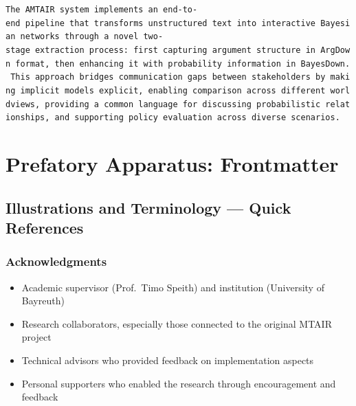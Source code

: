 \documentclass[
  11pt,
  letterpaper,
]{book}
\providecommand{\tightlist}{%
  \setlength{\itemsep}{0pt}\setlength{\parskip}{0pt}}
\begin{document}
\texttt{The\ AMTAIR\ system\ implements\ an\ end-to-end\ pipeline\ that\ transforms\ unstructured\ text\ into\ interactive\ Bayesian\ networks\ through\ a\ novel\ two-stage\ extraction\ process:\ first\ capturing\ argument\ structure\ in\ ArgDown\ format,\ then\ enhancing\ it\ with\ probability\ information\ in\ BayesDown.\ This\ approach\ bridges\ communication\ gaps\ between\ stakeholders\ by\ making\ implicit\ models\ explicit,\ enabling\ comparison\ across\ different\ worldviews,\ providing\ a\ common\ language\ for\ discussing\ probabilistic\ relationships,\ and\ supporting\ policy\ evaluation\ across\ diverse\ scenarios.}


\chapter*{Prefatory Apparatus:
Frontmatter}\label{prefatory-apparatus-frontmatter}


\section*{Illustrations and Terminology --- Quick
References}\label{illustrations-and-terminology-quick-references}


\subsection*{\texorpdfstring{\textbf{Acknowledgments}}{Acknowledgments}}\label{acknowledgments}

\begin{itemize}
\tightlist
\item
  Academic supervisor (Prof.~Timo Speith) and institution (University of
  Bayreuth)\\
\item
  Research collaborators, especially those connected to the original
  MTAIR project\\
\item
  Technical advisors who provided feedback on implementation aspects\\
\item
  Personal supporters who enabled the research through encouragement and
  feedback
\end{itemize}
\end{document}
